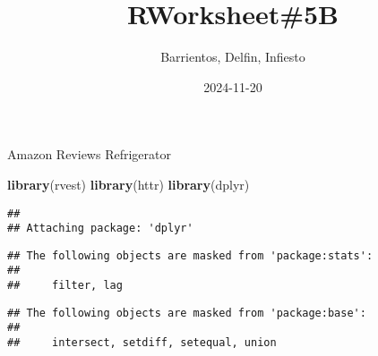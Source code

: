 \documentclass[
  11pt,
]{article}
\title{RWorksheet\#5B}
\author{Barrientos, Delfin, Infiesto}
\date{2024-11-20}
\newenvironment{Shaded}{\begin{snugshade}}{\end{snugshade}}
\newcommand{\FunctionTok}[1]{\textcolor[rgb]{0.13,0.29,0.53}{\textbf{#1}}}
\newcommand{\NormalTok}[1]{#1}
\begin{document}
\maketitle

Amazon Reviews Refrigerator

\begin{Shaded}
\begin{Highlighting}[]
\FunctionTok{library}\NormalTok{(rvest)}
\FunctionTok{library}\NormalTok{(httr)}
\FunctionTok{library}\NormalTok{(dplyr)}
\end{Highlighting}
\end{Shaded}

\begin{verbatim}
## 
## Attaching package: 'dplyr'
\end{verbatim}

\begin{verbatim}
## The following objects are masked from 'package:stats':
## 
##     filter, lag
\end{verbatim}

\begin{verbatim}
## The following objects are masked from 'package:base':
## 
##     intersect, setdiff, setequal, union
\end{verbatim}
\end{document}
